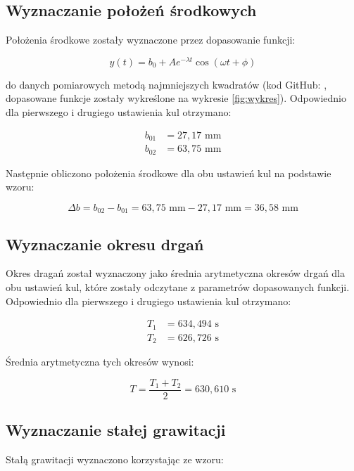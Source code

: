\documentclass[a4paper,12pt]{article}
\begin{document}
\renewcommand{\arraystretch}{1}

\subsection{Wyznaczanie położeń środkowych}

Położenia środkowe zostały wyznaczone przez dopasowanie funkcji:

$$
    y(t) = b_0 + A e^{-\lambda t} \cos(\omega t + \phi)
$$

do danych pomiarowych metodą najmniejszych kwadratów (kod GitHub: \cite{damped-oscillation-regression}, dopasowane funkcje zostały wykreślone na wykresie \ref{fig:wykres}). Odpowiednio dla pierwszego i drugiego ustawienia kul otrzymano:

\begin{align*}
    b_{01} & = 27{,}17\text{ mm} \\
    b_{02} & = 63{,}75\text{ mm}
\end{align*}

Następnie obliczono położenia środkowe dla obu ustawień kul na podstawie wzoru:

$$
    \Delta b = b_{02} - b_{01} = 63{,}75\text{ mm} - 27{,}17\text{ mm} = 36{,}58\text{ mm}
$$



\subsection{Wyznaczanie okresu drgań}

Okres dragań został wyznaczony jako średnia arytmetyczna okresów drgań dla obu ustawień kul, które zostały odczytane z parametrów dopasowanych funkcji. Odpowiednio dla pierwszego i drugiego ustawienia kul otrzymano:

\begin{align*}
    T_1 & = 634{,}494 \text{ s} \\
    T_2 & = 626{,}726 \text{ s}
\end{align*}

Średnia arytmetyczna tych okresów wynosi:

$$
    T = \frac{T_1 + T_2}{2} = 630{,}610 \text{ s}
$$

\subsection{Wyznaczanie stałej grawitacji}

Stałą grawitacji wyznaczono korzystając ze wzoru:
\end{document}
